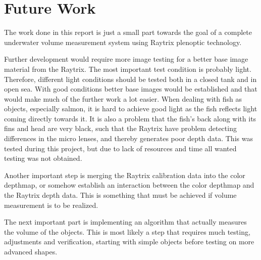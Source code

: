 \section{Future Work} \label{future_work}

The work done in this report is just a small part towards the goal of a complete underwater volume measurement system using Raytrix plenoptic technology. 

Further development would require more image testing for a better base image material from the Raytrix. The most important test condition is probably light. Therefore, different light conditions should be tested both in a closed tank and in open sea. With good conditions better base images would be established and that would make much of the further work a lot easier. 
When dealing with fish as objects, especially salmon, it is hard to achieve good light as the fish reflects light coming directly towards it. It is also a problem that the fish's back along with its fins and head are very black, such that the Raytrix have problem detecting differences in the micro lenses, and thereby generates poor depth data.
This was tested during this project, but due to lack of resources and time all wanted testing was not obtained.

Another important step is merging the Raytrix calibration data into the color depthmap, or somehow establish an interaction between the color depthmap and the Raytrix depth data. This is something that must be achieved if volume measurement is to be realized.

The next important part is implementing an algorithm that actually measures the volume of the objects. This is most likely a step that requires much testing, adjustments and verification, starting with simple objects before testing on more advanced shapes. 

